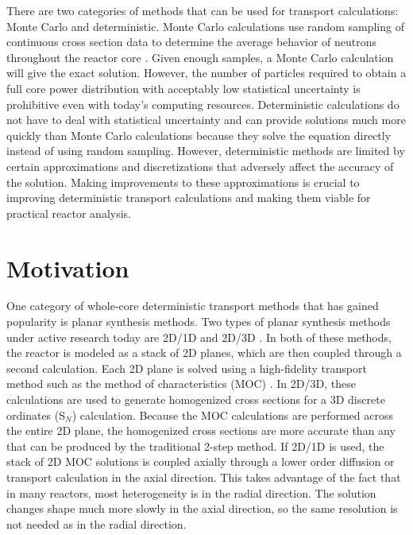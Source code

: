 There are two categories of methods that can be used for transport calculations: Monte Carlo and deterministic.  Monte Carlo calculations use random sampling of continuous cross section data to determine the average behavior of neutrons throughout the reactor core \cite{carter1975particle,spanier2008monte}.  Given enough samples, a Monte Carlo calculation will give the exact solution.  However, the number of particles required to obtain a full core power distribution with acceptably low statistical uncertainty is prohibitive even with today's computing resources.  Deterministic calculations do not have to deal with statistical uncertainty and can provide solutions much more quickly than Monte Carlo calculations because they solve the equation directly instead of using random sampling.  However, deterministic methods are limited by certain approximations and discretizations that adversely affect the accuracy of the solution.  Making improvements to these approximations is crucial to improving deterministic transport calculations and making them viable for practical reactor analysis.

\section{Motivation}

One category of whole-core deterministic transport methods that has gained popularity is planar synthesis methods.  Two types of planar synthesis methods under active research today are 2D/1D \cite{Fusion2D1D,3DHetWholeCoreTransPlanarMOC} and 2D/3D \cite{young2016orthogonal}.  In both of these methods, the reactor is modeled as a stack of 2D planes, which are then coupled through a second calculation.  Each 2D plane is solved using a high-fidelity transport method such as the method of characteristics (MOC) \cite{HalsallMOCOrigCACTUS1980}.  In 2D/3D, these calculations are used to generate homogenized cross sections for a 3D discrete ordinates (S$_N$) \cite{NEHandbook-MultigroupTransportDiffusionComputations} calculation.  Because the MOC calculations are performed across the entire 2D plane, the homogenized cross sections are more accurate than any that can be produced by the traditional 2-step method.  If 2D/1D is used, the stack of 2D MOC solutions is coupled axially through a lower order diffusion or transport calculation in the axial direction.  This takes advantage of the fact that in many reactors, most heterogeneity is in the radial direction.  The solution changes shape much more slowly in the axial direction, so the same resolution is not needed as in the radial direction.

